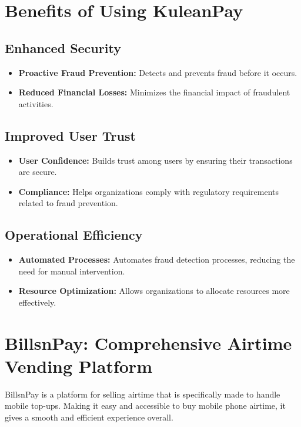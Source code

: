 \documentclass[a4paper,12pt]{report}
\begin{document}
	\section{Benefits of Using KuleanPay}
	
	\subsection{Enhanced Security}
	\begin{itemize}
		\item \textbf{Proactive Fraud Prevention:} Detects and prevents fraud before it occurs.
		\item \textbf{Reduced Financial Losses:} Minimizes the financial impact of fraudulent activities.
	\end{itemize}
	
	\subsection{Improved User Trust}
	\begin{itemize}
		\item \textbf{User Confidence:} Builds trust among users by ensuring their transactions are secure.
		\item \textbf{Compliance:} Helps organizations comply with regulatory requirements related to fraud prevention.
	\end{itemize}
	
	\subsection{Operational Efficiency}
	\begin{itemize}
		\item \textbf{Automated Processes:} Automates fraud detection processes, reducing the need for manual intervention.
		\item \textbf{Resource Optimization:} Allows organizations to allocate resources more effectively.
	\end{itemize}
	
	
	
	\section{BillsnPay: Comprehensive Airtime Vending Platform}
	BillsnPay is a platform for selling airtime that is specifically made to handle mobile top-ups. Making it easy and accessible to buy mobile phone airtime, it gives a smooth and efficient experience overall.
	
\end{document}

